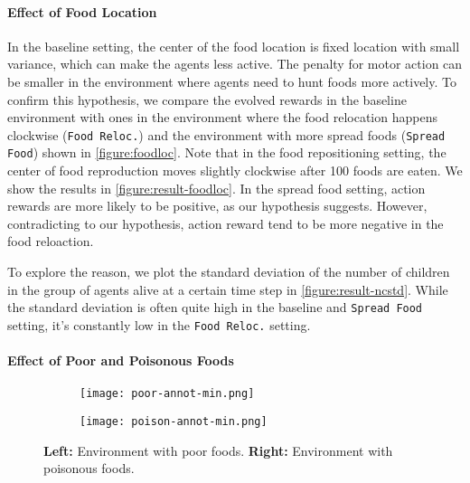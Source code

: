 \paragraph{Effect of Food Location}
In the baseline setting, the center of the food location is fixed location with small variance, which can make the agents less active. The penalty for motor action can be smaller in the environment where agents need to hunt foods more actively. To confirm this hypothesis, we compare the evolved rewards in the baseline environment with ones in the environment where the food relocation happens clockwise (\texttt{Food Reloc.}) and the environment with more spread foods (\texttt{Spread Food}) shown in \cref{figure:foodloc}. Note that in the food repositioning setting, the center of food reproduction moves slightly clockwise after 100 foods are eaten. We show the results in \cref{figure:result-foodloc}. In the spread food setting, action rewards are more likely to be positive, as our hypothesis suggests. However, contradicting to our hypothesis, action reward tend to be more negative in the food reloaction.

To explore the reason, we plot the standard deviation of the number of children in the group of agents alive at a certain time step in \cref{figure:result-ncstd}. While the standard deviation is often quite high in the baseline and \texttt{Spread Food} setting, it's constantly low in the \texttt{Food Reloc.} setting.

\paragraph{Effect of Poor and Poisonous Foods}

\begin{figure}[t]
  \begin{subfigure}[t]{4cm}
    \centering
    \texttt{[image: poor-annot-min.png]}
  \end{subfigure}
  \begin{subfigure}[t]{4cm}
    \centering
    \texttt{[image: poison-annot-min.png]}
  \end{subfigure}
  \caption{
    \textbf{Left:} Environment with poor foods.
    \textbf{Right:} Environment with poisonous foods.
  }\label{figure:pp}
\end{figure}

